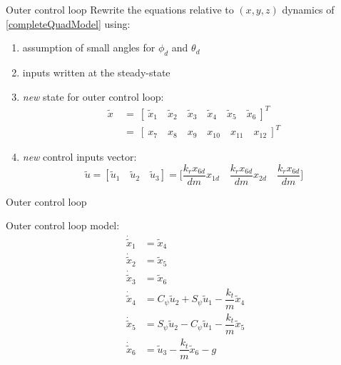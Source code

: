 \begin{frame}{Outer control loop}
	Rewrite the equations relative to $ (x,y,z) $ dynamics of \eqref{completeQuadModel} using:
	\begin{enumerate}
		\item assumption of small angles for $ \phi_d $ and $ \theta_d $
		\item inputs written at the steady-state
		\item \textit{new} state for outer control loop:
		\begin{align*}
		\tilde{x} \ &= \ [ \ \tilde{x}_1 \quad \tilde{x}_2 \quad \tilde{x}_3 \quad \tilde{x}_4 \quad \tilde{x}_5 \quad \tilde{x}_6 \ ]^T \\
		&= \ [ \ x_7 \quad x_8 \quad x_9 \quad x_{10} \quad x_{11} \quad x_{12} \ ]^T
		\end{align*}
		\item \textit{new} control inputs vector:
		\begin{equation}
		\tilde{u} = [\tilde{u}_1 \quad \tilde{u}_2 \quad \tilde{u}_3] = \Big[ \dfrac{k_r x_{6d}}{dm}  x_{1d} \quad  \dfrac{k_r x_{6d} }{dm} x_{2d} \quad  \dfrac{k_r x_{6d}}{dm} \Big]
		\label{OuterInputs}
		\end{equation}
	\end{enumerate}

\end{frame}

\begin{frame}{Outer control loop}
	\begin{alertblock}{Outer control loop model:}
		\begin{align*}
		\dot{\tilde{x}}_1 & = \tilde{x}_4 \\
		\dot{\tilde{x}}_2 & = \tilde{x}_5 \\
		\dot{\tilde{x}}_3 & = \tilde{x}_6 \\
		\dot{\tilde{x}}_4 & = C_\psi \tilde{u}_2 + S_\psi \tilde{u}_1 - \dfrac{k_t}{m} \tilde{x}_4 \\
		\dot{\tilde{x}}_5 & = S_\psi \tilde{u}_2 - C_\psi \tilde{u}_1 - \dfrac{k_t}{m} \tilde{x}_5 \\
		\dot{\tilde{x}}_6 & = \tilde{u}_3 - \dfrac{k_t}{m} \tilde{x}_6 - g
		\label{outerControl_}
		\end{align*}		
	\end{alertblock}
	\pause
	\centering
\end{frame}

